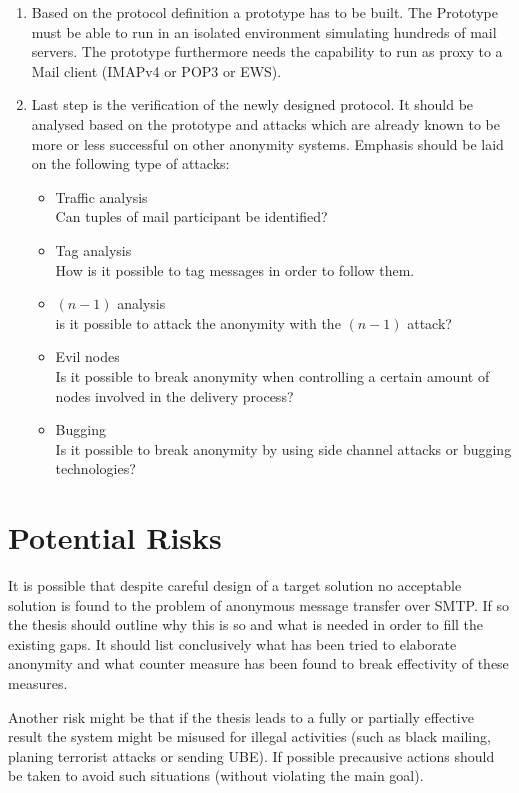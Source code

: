 \documentclass[twocolumn,a4paper,10pt,english]{scrartcl}
\newenvironment{myitemize}{\begin{itemize}\setlength{\itemsep}{0em}}{\end{itemize}}
\begin{document}
\begin{enumerate}
\item Based on the protocol definition a prototype has to be built. The Prototype must be able to run in an isolated environment simulating hundreds of mail servers. The prototype furthermore needs the capability to run as proxy to a Mail client (IMAPv4 or POP3 or EWS).\par

\item Last step is the verification of the newly designed protocol. It should be analysed based on the prototype and attacks which are already known to be more or less successful on other anonymity systems. Emphasis should be laid on the following type of attacks:\par
\begin{myitemize}
\item Traffic analysis\\Can tuples of mail participant be identified?  
\item Tag analysis\\How is it possible to tag messages in order to follow them.
\item $(n-1)$ analysis\\is it possible to attack the anonymity with the $(n-1)$ attack?
\item Evil nodes\\ Is it possible to break anonymity when controlling a certain amount of nodes involved in the delivery process?
\item Bugging\\Is it possible to break anonymity by using side channel attacks or bugging technologies?
\end{myitemize}
\end{enumerate}

\section{Potential Risks}
It is possible that despite careful design of a target solution no acceptable solution is found to the problem of anonymous message transfer over SMTP. If so the thesis should outline why this is so and what is needed in order to fill the existing gaps. It should list conclusively what has been tried to elaborate anonymity and what counter measure has been found to break effectivity of these measures.\par

Another risk might be that if the thesis leads to a fully or partially effective result the system might be misused for illegal activities (such as black mailing, planing terrorist attacks or sending UBE). If possible precausive actions should be taken to avoid such situations (without violating the main goal).\par
\end{document}
